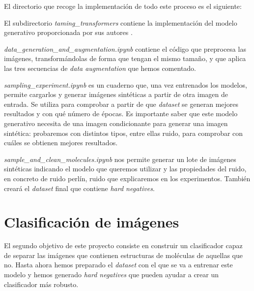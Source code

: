 El directorio que recoge la implementación de todo este proceso es el siguiente:

\vspace{0.3cm}

El subdirectorio \textit{taming\_transformers} contiene la implementación del modelo generativo proporcionada por sus autores \cite{taming-transformers-github}. 

\textit{{data\_generation\_and\_augmentation.ipynb}} contiene el código que preprocesa las imágenes, transformándolas de forma que tengan el mismo tamaño, y que aplica las tres secuencias de \textit{data augmentation} que hemos comentado.

\textit{sampling\_experiment.ipynb} es un cuaderno que, una vez entrenados los modelos, permite cargarlos y generar imágenes sintéticas a partir de otra imagen de entrada. Se utiliza para comprobar a partir de que \textit{dataset} se generan mejores resultados y con qué número de épocas. Es importante saber que este modelo generativo necesita de una imagen condicionante para generar una imagen sintética: probaremos con distintos tipos, entre ellas ruido, para comprobar con cuáles se obtienen mejores resultados.

\textit{sample\_and\_clean\_molecules.ipynb} nos permite generar un lote de imágenes sintéticas indicando el modelo que queremos utilizar y las propiedades del ruido, en concreto de ruido perlín, ruido que explicaremos en los experimentos. También creará el \textit{dataset} final que contiene \textit{hard negatives}.



\newpage
\section{Clasificación de imágenes}
El segundo objetivo de este proyecto consiste en construir un clasificador capaz de separar las imágenes que contienen estructuras de moléculas de aquellas que no. Hasta ahora hemos preparado el \textit{dataset} con el que se va a entrenar este modelo y hemos generado \textit{hard negatives} que pueden ayudar a crear un clasificador más robusto.

